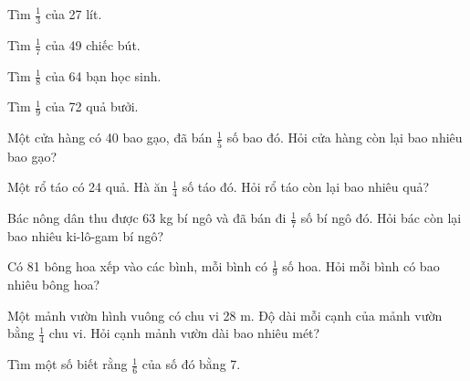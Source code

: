 \begin{ex}
Tìm $\frac{1}{3}$ của 27 lít.
\end{ex}

\begin{ex}
Tìm $\frac{1}{7}$ của 49 chiếc bút.
\end{ex}

\begin{ex}
Tìm $\frac{1}{8}$ của 64 bạn học sinh.
\end{ex}

\begin{ex}
Tìm $\frac{1}{9}$ của 72 quả bưởi.
\end{ex}

\begin{ex}
Một cửa hàng có 40 bao gạo, đã bán $\frac{1}{5}$ số bao đó. Hỏi cửa hàng còn lại bao nhiêu bao gạo?
\end{ex}

\begin{ex}
Một rổ táo có 24 quả. Hà ăn $\frac{1}{4}$ số táo đó. Hỏi rổ táo còn lại bao nhiêu quả?
\end{ex}

\begin{ex}
Bác nông dân thu được 63 kg bí ngô và đã bán đi $\frac{1}{7}$ số bí ngô đó. Hỏi bác còn lại bao nhiêu ki-lô-gam bí ngô?
\end{ex}

\begin{ex}
Có 81 bông hoa xếp vào các bình, mỗi bình có $\frac{1}{9}$ số hoa. Hỏi mỗi bình có bao nhiêu bông hoa?
\end{ex}

\begin{ex}
Một mảnh vườn hình vuông có chu vi 28 m. Độ dài mỗi cạnh của mảnh vườn bằng $\frac{1}{4}$ chu vi. Hỏi cạnh mảnh vườn dài bao nhiêu mét?
\end{ex}

\begin{ex}
Tìm một số biết rằng $\frac{1}{6}$ của số đó bằng 7.
\end{ex}

